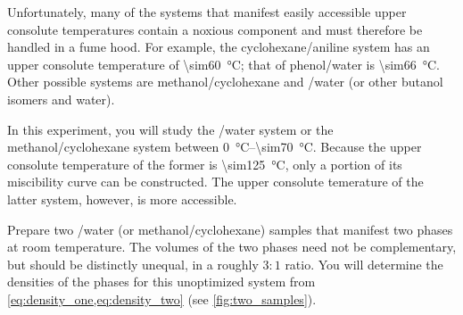 Unfortunately, many of the systems that manifest easily accessible upper consolute temperatures contain a noxious component and must therefore be handled in a fume hood. 
For example, the cyclohexane/aniline system has an upper consolute temperature of \qty{\sim60}{\degreeCelsius}; that of phenol/water is \qty{\sim66}{\degreeCelsius}. Other possible systems are methanol/cyclohexane and /water (or other butanol isomers and water). 

In this experiment, you will study the /water system or the methanol/cyclohexane system between \qtyrange{0}{\sim70}{\degreeCelsius}. 
Because the upper consolute temperature of the former is \qty{\sim125}{\degreeCelsius}, only a portion of its miscibility curve can be constructed. 
The upper consolute temerature of the latter system, however, is more accessible. 

Prepare two /water (or methanol/cyclohexane) samples that manifest two phases at room temperature. 
The volumes of the two phases need not be complementary, but should be distinctly unequal, in a roughly \(3{:}1\) ratio. 
You will determine the densities of the phases for this unoptimized system from \cref{eq:density_one,eq:density_two} (see \cref{fig:two_samples}). 

